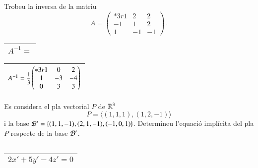 \documentclass[11pt,catalan]{article}
\begin{document}
\begin{enunciat}
Trobeu la inversa de la matriu 
\[
  A = \begin{pmatrix}{*{3}r} 1 & 2 & 2\\ -1 & 1 & 2\\ 1 & -1 & -1\end{pmatrix}\,.
\]
\end{enunciat}

\begin{quadricula}
\begin{tabular}{|L{5cm}{1.25cm}|}
\hline
$A^{-1}=$ \\
\hline
\end{tabular}
\end{quadricula}

\begin{solucio}
\begin{center}
\begin{tabular}{|C{5cm}{1.25cm}|}
\hline
$A^{-1}=\deufrac{1}{3}\begin{pmatrix}{*{3}r} 1 & 0 & 2\\ 1 & -3 & -4\\ 0 & 3 & 3\end{pmatrix}$ \\
\hline
\end{tabular}
\end{center}
\end{solucio}


\begin{enunciat}
Es considera el pla vectorial $P$ de $\rn 3$
\[
  P = \langle (1,1,1), (1,2,-1) \rangle
\]
i la base $\cal B'=\{(1,1,-1),(2,1,-1),(-1,0,1)\}$. Determineu l'equació implícita del pla $P$ respecte de la base $\cal B'$.
\end{enunciat}

\begin{quadricula}
\begin{tabular}{|C{5cm}{0.5cm}|}
\hline
 \\
\hline
\end{tabular}
\end{quadricula}

\begin{solucio}
\begin{center}
\begin{tabular}{|C{5cm}{0.5cm}|}
\hline
$2 x' + 5 y' - 4 z' = 0$ \\
\hline
\end{tabular}
\end{center}
\end{solucio}
\end{document}
